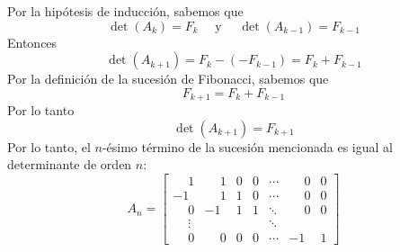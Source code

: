 \begin{example}
    Por la hipótesis de inducción, sabemos que
    $$\det(A_k) = F_k \quad \text{ y } \quad \det(A_{k-1}) = F_{k-1}$$
    Entonces
    $$\det(A_{k+1}) = F_k - (-F_{k-1}) = F_k + F_{k-1}$$
    Por la definición de la sucesión de Fibonacci, sabemos que
    $$F_{k+1} = F_k + F_{k-1}$$
    Por lo tanto
    $$\det(A_{k+1}) = F_{k+1}$$
    Por lo tanto, el $n$-ésimo término de la sucesión mencionada es igual al determinante de orden $n$:
    $$A_n = \begin{bmatrix}
        \phantom{-}1 & \phantom{-}1 & 0 & 0 & \cdots & \phantom{-}0 & 0 \\
        -1 & \phantom{-}1 & 1 & 0 & \cdots & \phantom{-}0 & 0 \\
        \phantom{-}0 & -1 & 1 & 1 & \ddots & \phantom{-}0 & 0 \\
        \phantom{-}\vdots & & & & \ddots & & \\
        \phantom{-}0 & \phantom{-}0 & 0 & 0 & \cdots & -1 & 1
    \end{bmatrix}$$
\end{example}

